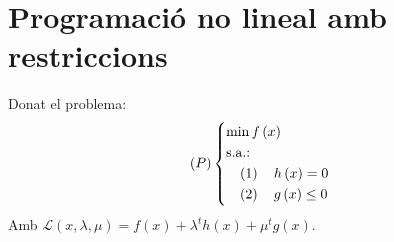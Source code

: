 \section{Programaci\'o no lineal amb restriccions}

Donat el problema:
\begin{equation*}
    \lp P \rp \begin{dcases*}
        \min f \left( x \right) \\
        \text{s.a.: } \\
        \quad \left( 1 \right) \quad h \left( x \right) = 0 \\
        \quad \left( 2 \right) \quad g \left( x \right) \leq 0 \\
    \end{dcases*}
\end{equation*}
Amb $\mathcal{L} \left( x, \lambda, \mu \right) = f\left( x \right) + \lambda^t h\left( x \right) + \mu^t g\left( x \right)$.

